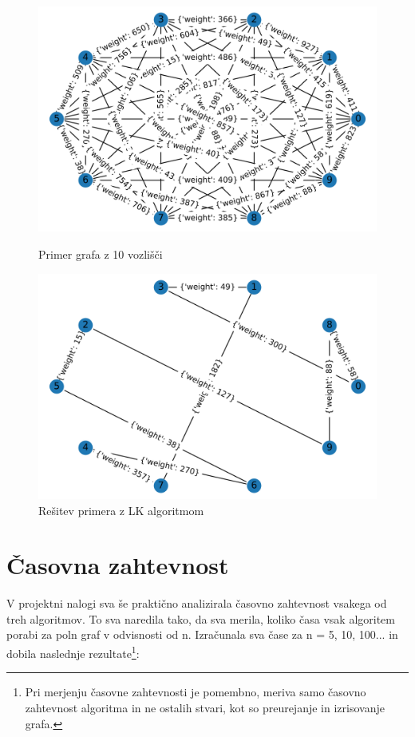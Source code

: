 \documentclass[12pt, a4paper]{article}
\begin{document}
\begin{figure}[!h]
    
    \begin{minipage}{0.5\textwidth}
    \includegraphics[width=7 cm]{primeri/primer2.png}
    \caption{Primer grafa z 10 vozlišči}
    \label{primer_LK}
  \end{minipage}
 \hspace{1cm}
  \begin{minipage}{0.5\textwidth}
    \includegraphics[width=7 cm]{primeri/primer2_lk.png}
    \caption{Rešitev primera z LK algoritmom}
    \label{resitev_LK}
  \end{minipage}
    
\end{figure}

\newpage

\section[Časovna zahtevnost]{Časovna zahtevnost}
V projektni nalogi sva še praktično analizirala časovno zahtevnost vsakega od treh algoritmov. To sva naredila tako, da sva merila, koliko časa vsak algoritem porabi za poln graf v odvisnosti od n. Izračunala sva čase za n = 5, 10, 100... in dobila naslednje rezultate\footnote{Pri merjenju časovne zahtevnosti je pomembno, meriva samo časovno zahtevnost algoritma in ne ostalih stvari, kot so preurejanje in izrisovanje grafa.}:
\end{document}
